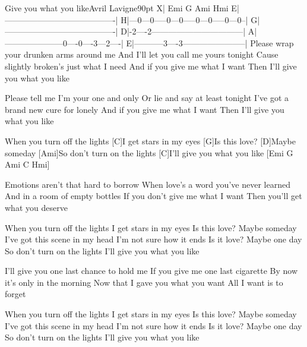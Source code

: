\begin{song}{Give you what you like}{Avril Lavigne}{90pt}
\tabs{90pt}
X| Emi       G         Ami       Hmi
E|----------------------------------------|
H|---0---0-----0---0-----0---0-----0---0--|
G|----------------------------------------|
D|-2----2---------------------------------|
A|---------------------0----0----3---2----|
E|-----------3----3-----------------------|
\endtabs
{}%
Please wrap your drunken arms around me
And I'll let you call me yours tonight
Cause slightly broken's just what I need
And if you give me what I want
Then I'll give you what you like

%
Please tell me I'm your one and only
Or lie and say at least tonight
I've got a brand new cure for lonely
And if you give me what I want
Then I'll give you what you like

\chorus%
[Ami]When you turn off the lights
[C]I get stars in my eyes
[G]Is this love?
[D]Maybe someday
[Ami]So don't turn on the lights
[C]I'll give you what you like [Emi G Ami C Hmi]

%
Emotions aren't that hard to borrow
When love's a word you've never learned
And in a room of empty bottles
If you don't give me what I want
Then you'll get what you deserve

\chorus%
When you turn off the lights
I get stars in my eyes
Is this love?
Maybe someday
I've got this scene in my head
I'm not sure how it ends
Is it love?
Maybe one day
So don't turn on the lights
I'll give you what you like

%
I'll give you one last chance to hold me
If you give me one last cigarette
By now it's only in the morning
Now that I gave you what you want
All I want is to forget

\chorus%
When you turn off the lights
I get stars in my eyes
Is this love?
Maybe someday
I've got this scene in my head
I'm not sure how it ends
Is it love?
Maybe one day
So don't turn on the lights
I'll give you what you like
\end{song}
